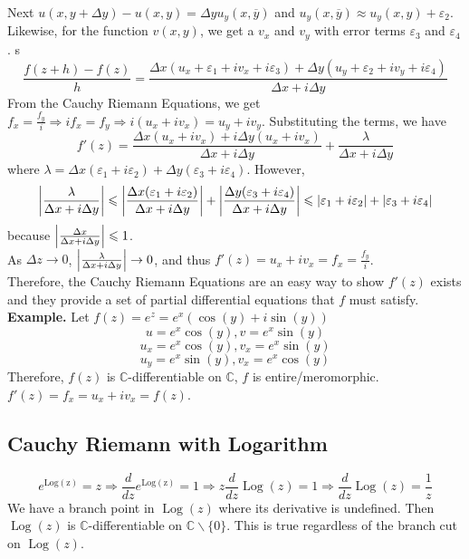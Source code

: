 \documentclass[11pt]{article}
\DeclarePairedDelimiter\abs{\lvert}{\rvert}
\begin{document}
Next $u(x, y + \Delta y) - u(x, y) = \Delta y u_y(x, \overline y)$ and $u_y(x, \overline y) \approx u_y(x, y) + \varepsilon_2$. \\
Likewise, for the function $v(x, y)$, we get a $v_x$ and $v_y$ with error terms $\varepsilon_3$ and $\varepsilon_4$. s
$$\frac{f(z + h) - f(z)}{h} = \frac{\Delta x(u_x + \varepsilon_1 + iv_x + i\varepsilon_3) + \Delta y(u_y + \varepsilon_2 + iv_y + i\varepsilon_4)}{\Delta x + i \Delta y}$$
From the Cauchy Riemann Equations, we get $f_x = \frac{f_y}{i} \Rightarrow if_x = f_y \Rightarrow i(u_x + iv_x) = u_y + iv_y$. Substituting the terms, we have 
$$f'(z) = \frac{\Delta x(u_x + iv_x) + i \Delta y(u_x + iv_x)}{\Delta x + i \Delta y} + \frac{\lambda}{\Delta x + i\Delta y}$$
where $\lambda = \Delta x(\varepsilon_1 + i\varepsilon_2) + \Delta y(\varepsilon_3 + i\varepsilon_4)$. However, \\
$$\abs*{\frac{\lambda}{\Delta x+ i \Delta y}} \leqslant \abs*{\frac{\Delta x(\varepsilon_1 + i\varepsilon_2)}{\Delta x + i\Delta y}} + \abs*{\frac{\Delta y(\varepsilon_3 + i\varepsilon_4)}{\Delta x + i \Delta y}} \leqslant |\varepsilon_1 + i\varepsilon_2| + |\varepsilon_3 + i\varepsilon_4|$$ 
because $\abs*{\frac{\Delta x}{\Delta x + i\Delta y}} \leqslant 1$. \\
As $\Delta z \to 0$, $\abs*{\frac{\lambda}{\Delta x+ i \Delta y}} \to 0$, and thus $f'(z) = u_x + iv_x = f_x = \frac{f_y}{i}$. \\
Therefore, the Cauchy Riemann Equations are an easy way to show $f'(z)$ exists and they provide a set of partial differential equations that $f$ must satisfy. \\
\newline
\textbf{Example.} Let $f(z) = e^z = e^x(\cos(y) + i\sin(y))$ 
$$u = e^x\cos(y), v = e^x\sin(y)$$ 
$$u_x = e^x\cos(y), v_x = e^x\sin(y)$$
$$u_y = e^x\sin(y), v_x = e^x\cos(y)$$
Therefore, $f(z)$ is $\mathbb{C}$-differentiable on $\mathbb{C}$, $f$ is entire/meromorphic. $f'(z) = f_x = u_x + iv_x = f(z)$.

\subsection{Cauchy Riemann with Logarithm}
$$e^{\operatorname{Log(z)}} = z \Rightarrow \frac{d}{dz}e^{\operatorname{Log(z)}} = 1 \Rightarrow z\frac{d}{dz}\operatorname{Log}(z) = 1 \Rightarrow \frac{d}{dz}\operatorname{Log}(z) = \frac{1}{z}$$
We have a branch point in $\operatorname{Log}(z)$ where its derivative is undefined. Then $\operatorname{Log}(z)$ is $\mathbb{C}$-differentiable on $\mathbb{C} \backslash \{0\}$. This is true regardless of the branch cut on $\operatorname{Log}(z)$. 
\end{document}
